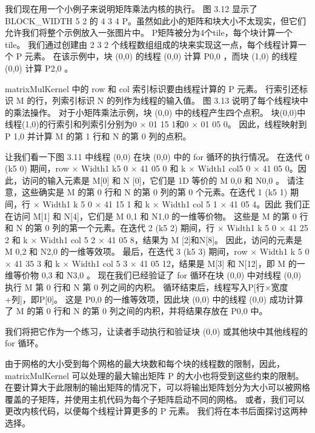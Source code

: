 我们现在用一个小例子来说明矩阵乘法内核的执行。 图 3.12 显示了 BLOCK\_WIDTH 5 2 的 4 3 4 P。虽然如此小的矩阵和块大小不太现实，但它们允许我们将整个示例放入一张图片中。 P矩阵被分为4个tile，每个块计算一个tile。 我们通过创建由 2 3 2 个线程数组组成的块来实现这一点，每个线程计算一个 P 元素。 在该示例中，块 (0,0) 的线程 (0,0) 计算 P0,0 ，而块 (1,0) 的线程 (0,0) 计算 P2,0 。

matrixMulKernel 中的 row 和 col 索引标识要由线程计算的 P 元素。 行索引还标识 M 的行，列索引标识 N 的列作为线程的输入值。 图 3.13 说明了每个线程块中的乘法操作。 对于小矩阵乘法示例，块 (0,0) 中的线程产生四个点积。 块(0,0)中线程(1,0)的行索引和列索引分别为0 × 01 15 1和0 × 01 05 0。 因此，线程映射到 P 1,0 并计算 M 的第 1 行和 N 的第 0 列的点积。

让我们看一下图 3.11 中线程 (0,0) 在块 (0,0) 中的 for 循环的执行情况。 在迭代 0 (k5 0) 期间，row × Width1 k5 0 × 41 05 0 和 k × Width1 col5 0 × 41 05 0。因此，访问的输入元素是 M[0] 和 N [0]，它们是 1D 等价的 M 0,0 和 N0,0 。 请注意，这些确实是 M 的第 0 行和 N 的第 0 列的第 0 个元素。在迭代 1 (k5 1) 期间，行 × Width1 k 5 0 × 41 15 1 和 k × Width1 col 5 1 × 41 05 4。因此 我们正在访问 M[1] 和 N[4]，它们是 M 0,1 和 N1,0 的一维等价物。 这些是 M 的第 0 行和 N 的第 0 列的第一个元素。在迭代 2 (k5 2) 期间，行 × Width1 k 5 0 × 41 25 2 和 k × Width1 col 5 2 × 41 05 8，结果为 M [2]和N[8]。 因此，访问的元素是 M 0,2 和 N2,0 的一维等效项。 最后，在迭代 3 (k5 3) 期间，row × Width1 k 5 0 × 41 35 3 和 k × Width1 col 5 3 × 41 05 12，结果是 M[3] 和 N[12]，即 M 的一维等价物 0,3 和 N3,0 。 现在我们已经验证了 for 循环在块 (0,0) 中对线程 (0,0) 执行 M 第 0 行和 N 第 0 列之间的内积。 循环结束后，线程写入P[行×宽度+列]，即P[0]。 这是 P0,0 的一维等效项，因此块 (0,0) 中的线程 (0,0) 成功计算了 M 的第 0 行和 N 的第 0 列之间的内积，并将结果存放在 P0,0 中。

我们将把它作为一个练习，让读者手动执行和验证块 (0,0) 或其他块中其他线程的 for 循环。

由于网格的大小受到每个网格的最大块数和每个块的线程数的限制，因此，matrixMulKernel 可以处理的最大输出矩阵 P 的大小也将受到这些约束的限制。 在要计算大于此限制的输出矩阵的情况下，可以将输出矩阵划分为大小可以被网格覆盖的子矩阵，并使用主机代码为每个子矩阵启动不同的网格。 或者，我们可以更改内核代码，以便每个线程计算更多的 P 元素。 我们将在本书后面探讨这两种选择。






